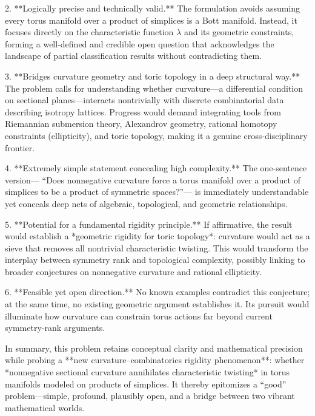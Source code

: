 2. **Logically precise and technically valid.**  
   The formulation avoids assuming every torus manifold over a product of simplices is a Bott manifold.  Instead, it focuses directly on the characteristic function \(\lambda\) and its geometric constraints, forming a well-defined and credible open question that acknowledges the landscape of partial classification results without contradicting them.

3. **Bridges curvature geometry and toric topology in a deep structural way.**  
   The problem calls for understanding whether curvature—a differential condition on sectional planes—interacts nontrivially with discrete combinatorial data describing isotropy lattices.  Progress would demand integrating tools from Riemannian submersion theory, Alexandrov geometry, rational homotopy constraints (ellipticity), and toric topology, making it a genuine cross-disciplinary frontier.

4. **Extremely simple statement concealing high complexity.**  
   The one-sentence version—  
   “Does nonnegative curvature force a torus manifold over a product of simplices to be a product of symmetric spaces?”—  
   is immediately understandable yet conceals deep nets of algebraic, topological, and geometric relationships.

5. **Potential for a fundamental rigidity principle.**  
   If affirmative, the result would establish a *geometric rigidity for toric topology*: curvature would act as a sieve that removes all nontrivial characteristic twisting.  This would transform the interplay between symmetry rank and topological complexity, possibly linking to broader conjectures on nonnegative curvature and rational ellipticity.

6. **Feasible yet open direction.**  
   No known examples contradict this conjecture; at the same time, no existing geometric argument establishes it.  Its pursuit would illuminate how curvature can constrain torus actions far beyond current symmetry-rank arguments.

In summary, this problem retains conceptual clarity and mathematical precision while probing a **new curvature–combinatorics rigidity phenomenon**: whether *nonnegative sectional curvature annihilates characteristic twisting* in torus manifolds modeled on products of simplices. It thereby epitomizes a “good” problem—simple, profound, plausibly open, and a bridge between two vibrant mathematical worlds.